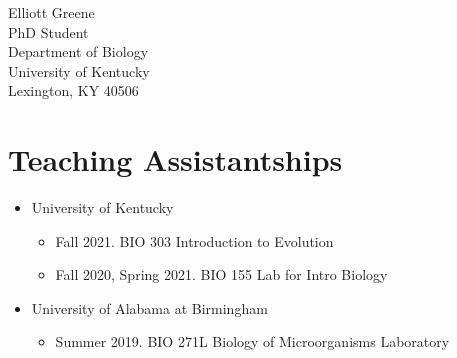 \documentclass[11pt]{article}
\begin{document}
    \begin{center}
        \begin{minipage}{2.00in} \centering
            Elliott Greene\\
            PhD Student\\
            Department of Biology \\
            University of Kentucky \\
            Lexington, KY 40506
        \end{minipage}
    \end{center}

    \section{Teaching Assistantships}
    \begin{itemize}
        \item University of Kentucky
            \begin{itemize}
            \item Fall 2021. BIO 303 Introduction to Evolution
            \item Fall 2020, Spring 2021. BIO 155 Lab for Intro Biology
            \end{itemize}
        \item University of Alabama at Birmingham
            \begin{itemize}
            \item Summer 2019. BIO 271L Biology of Microorganisms Laboratory
            \end{itemize}
    \end{itemize}
\end{document}
